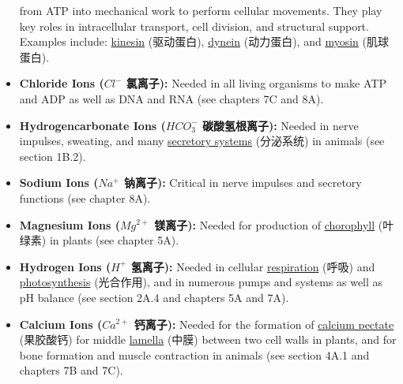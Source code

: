 \begin{itemize}
{    from ATP into mechanical work to perform cellular movements. They play key roles in intracellular transport, cell division,
    and structural support. Examples include: \underline{kinesin} (驱动蛋白), \underline{dynein} (动力蛋白), and \underline{myosin}
    (肌球蛋白).}
    \item\textbf{Chloride Ions ($Cl^-$ 氯离子):} Needed in all living organisms to make ATP and ADP as well as DNA and RNA (see
    chapters 7C and 8A).
    \item \textbf{Hydrogencarbonate Ions ($HCO_3^-$ 碳酸氢根离子):} Needed in nerve impulses, sweating, and many
    \underline{secretory systems} (分泌系统) in animals (see section 1B.2).
    \item \textbf{Sodium Ions ($Na^+$ 钠离子):} Critical in nerve impulses and secretory functions (see chapter 8A).
    \item \textbf{Magnesium Ions ($Mg^{2+}$ 镁离子):} Needed for production of \underline{chorophyll} (叶绿素) in plants (see
    chapter 5A).
    \item \textbf{Hydrogen Ions ($H^+$ 氢离子):} Needed in cellular \underline{respiration} (呼吸) and \underline{photosynthesis}
    (光合作用), and in numerous pumps and systems as well as pH balance (see section 2A.4 and chapters 5A and 7A).
    \item \textbf{Calcium Ions ($Ca^{2+}$ 钙离子):} Needed for the formation of \underline{calcium pectate} (果胶酸钙) for middle
    \underline{lamella} (中膜) between two cell walls in plants, and for bone formation and muscle contraction in animals (see
    section 4A.1 and chapters 7B and 7C).
\end{itemize}
